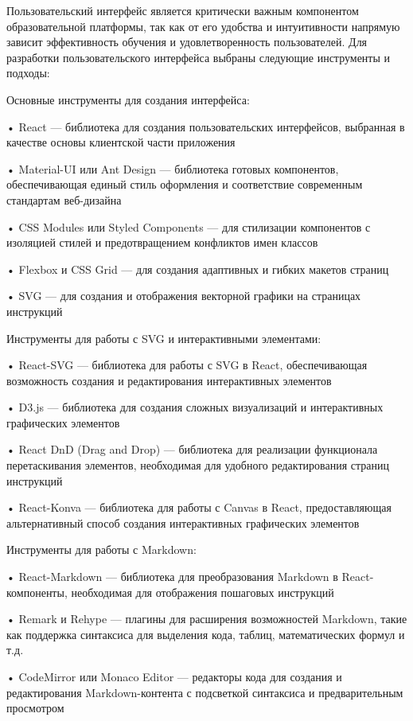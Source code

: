 {\gostFont

  \par \redline Пользовательский интерфейс является критически важным компонентом образовательной платформы, так как от его удобства и интуитивности напрямую зависит эффективность обучения и удовлетворенность пользователей. Для разработки пользовательского интерфейса выбраны следующие инструменты и подходы:

  \par \redline Основные инструменты для создания интерфейса:

  \par \redline • React — библиотека для создания пользовательских интерфейсов, выбранная в качестве основы клиентской части приложения
  \par \redline • Material-UI или Ant Design — библиотека готовых компонентов, обеспечивающая единый стиль оформления и соответствие современным стандартам веб-дизайна
  \par \redline • CSS Modules или Styled Components — для стилизации компонентов с изоляцией стилей и предотвращением конфликтов имен классов
  \par \redline • Flexbox и CSS Grid — для создания адаптивных и гибких макетов страниц
  \par \redline • SVG — для создания и отображения векторной графики на страницах инструкций

  \par \redline Инструменты для работы с SVG и интерактивными элементами:

  \par \redline • React-SVG — библиотека для работы с SVG в React, обеспечивающая возможность создания и редактирования интерактивных элементов
  \par \redline • D3.js — библиотека для создания сложных визуализаций и интерактивных графических элементов
  \par \redline • React DnD (Drag and Drop) — библиотека для реализации функционала перетаскивания элементов, необходимая для удобного редактирования страниц инструкций
  \par \redline • React-Konva — библиотека для работы с Canvas в React, предоставляющая альтернативный способ создания интерактивных графических элементов

  \par \redline Инструменты для работы с Markdown:

  \par \redline • React-Markdown — библиотека для преобразования Markdown в React-компоненты, необходимая для отображения пошаговых инструкций
  \par \redline • Remark и Rehype — плагины для расширения возможностей Markdown, такие как поддержка синтаксиса для выделения кода, таблиц, математических формул и т.д.
  \par \redline • CodeMirror или Monaco Editor — редакторы кода для создания и редактирования Markdown-контента с подсветкой синтаксиса и предварительным просмотром

}
